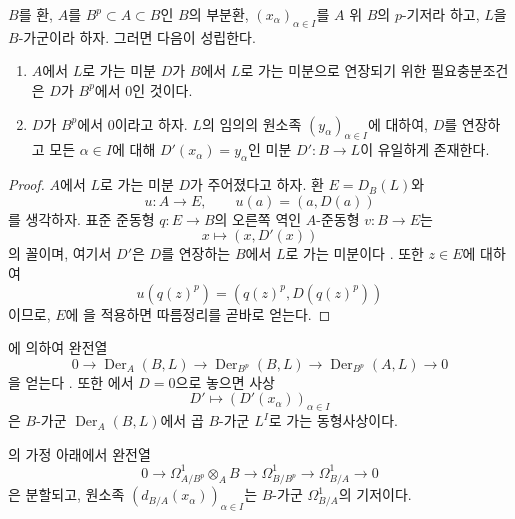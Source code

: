\begin{corollary}[21.2.3]
\label{0.21.2.3-ko}
$B$를 환, $A$를 $B^p\subset A\subset B$인 $B$의 부분환,
$(x_\alpha)_{\alpha\in I}$를 $A$ 위 $B$의 $p$-기저라 하고,
$L$을 $B$-가군이라 하자. 그러면 다음이 성립한다.
\begin{enumerate}
  \item[(i)] $A$에서 $L$로 가는 미분 $D$가 $B$에서 $L$로 가는
  미분으로 연장되기 위한 필요충분조건은 $D$가 $B^p$에서 $0$인
  것이다.
  \item[(ii)] $D$가 $B^p$에서 $0$이라고 하자. $L$의 임의의 원소족
  $(y_\alpha)_{\alpha\in I}$에 대하여, $D$를 연장하고 모든
  $\alpha\in I$에 대해 $D'(x_\alpha)=y_\alpha$인 미분
  $D':B\to L$이 유일하게 존재한다.
\end{enumerate}
\end{corollary}

\begin{proof}
$A$에서 $L$로 가는 미분 $D$가 주어졌다고 하자. 환 $E=D_B(L)$와
\[
  u:A\longrightarrow E,\qquad u(a)=(a,D(a))
\]
를 생각하자. 표준 준동형 $q:E\to B$의 오른쪽 역인 $A$-준동형
$v:B\to E$는
\[
  x\longmapsto(x,D'(x))
\]
의 꼴이며, 여기서 $D'$은 $D$를 연장하는 $B$에서 $L$로 가는
미분이다 . 또한 $z\in E$에 대하여
\[
  u(q(z)^p)=(q(z)^p,D(q(z)^p))
\]
이므로, $E$에 을 적용하면 따름정리를 곧바로
얻는다.
\end{proof}

에 의하여 완전열
\begin{equation}
\tag{21.2.3.1}
\label{0.21.2.3.1-ko}
0\longrightarrow\operatorname{Der}_A(B,L)
\longrightarrow\operatorname{Der}_{B^p}(B,L)
\longrightarrow\operatorname{Der}_{B^p}(A,L)\longrightarrow0
\end{equation}
을 얻는다 . 또한 에서
$D=0$으로 놓으면 사상
\begin{equation}
\tag{21.2.3.2}
\label{0.21.2.3.2-ko}
D'\longmapsto(D'(x_\alpha))_{\alpha\in I}
\end{equation}
은 $B$-가군 $\operatorname{Der}_A(B,L)$에서 곱 $B$-가군 $L^I$로
가는 동형사상이다.

\begin{corollary}[21.2.4]
\label{0.21.2.4-ko}
의 가정 아래에서 완전열
\begin{equation}
\tag{21.2.4.1}
\label{0.21.2.4.1-ko}
0\longrightarrow\Omega^1_{A/B^p}\otimes_A B
\longrightarrow\Omega^1_{B/B^p}
\longrightarrow\Omega^1_{B/A}\longrightarrow0
\end{equation}
은 분할되고, 원소족
$(d_{B/A}(x_\alpha))_{\alpha\in I}$는 $B$-가군
$\Omega^1_{B/A}$의 기저이다.
\end{corollary}

